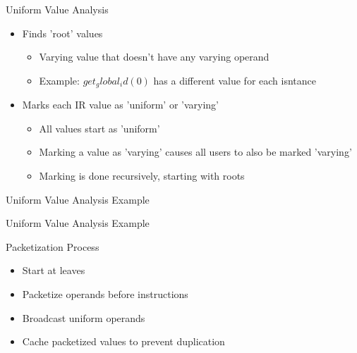 \begin{frame}{Uniform Value Analysis}

\begin{itemize}
    \item Finds 'root' values
    \begin{itemize}
        \item Varying value that doesn't have any varying operand
        \item Example: $get_global_id(0)$ has a different value for each isntance
    \end{itemize}
    \item Marks each IR value as 'uniform' or 'varying'
    \begin{itemize}
        \item All values start as 'uniform'
        \item Marking a value as 'varying' causes all users to also be marked 'varying'
        \item Marking is done recursively, starting with roots
    \end{itemize}
\end{itemize}

\end{frame}


\begin{frame}{Uniform Value Analysis Example}


\end{frame}


\begin{frame}{Uniform Value Analysis Example}


\end{frame}


\begin{frame}{Packetization Process}

\begin{itemize}
    \item Start at leaves
    \item Packetize operands before instructions
    \item Broadcast uniform operands
    \item Cache packetized values to prevent duplication
\end{itemize}

\end{frame}

